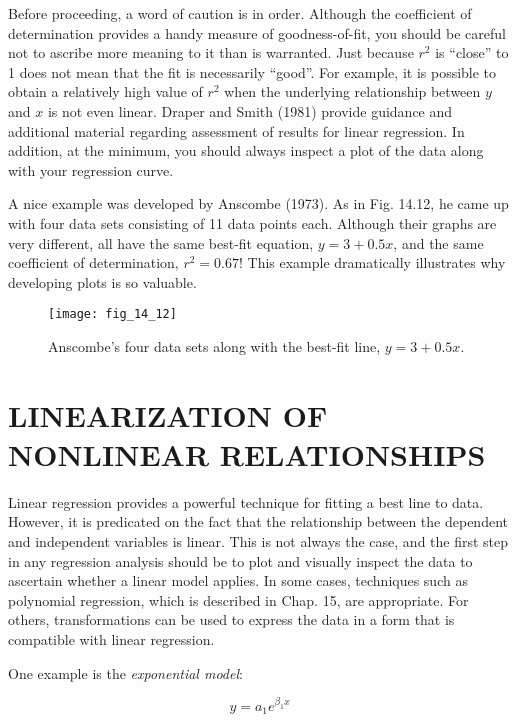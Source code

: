 \documentclass[../main.tex]{subfiles}
\begin{document}
Before proceeding, a word of caution is in order. Although the coefficient of determination provides a handy measure of goodness-of-fit, you should be careful not to ascribe more meaning to it than is warranted. Just because $r^2$ is ``close'' to 1 does not mean that the fit is necessarily ``good''. For example, it is possible to obtain a relatively high value of $r^2$ when the underlying relationship between $y$ and $x$ is not even linear. Draper and Smith (1981) provide guidance and additional material regarding assessment of results for linear regression. In addition, at the minimum, you should always inspect a plot of the data along with your regression curve.

A nice example was developed by Anscombe (1973). As in Fig. 14.12, he came up with four data sets consisting of 11 data points each. Although their graphs are very different, all have the same best-fit equation, $y = 3 + 0.5 x$, and the same coefficient of determination, $r^2 = 0.67$! This example dramatically illustrates why developing plots is so valuable.

\begin{figure}[H]
	\centering
	\texttt{[image: fig\_14\_12]}
	\caption{\textsf{Anscombe's four data sets along with the best-fit line, $y = 3 + 0.5x$.}}
	\label{fig:fig_14_12}
\end{figure}


\label{cha:cha_P_14_4}
\section{LINEARIZATION OF NONLINEAR RELATIONSHIPS}

Linear regression provides a powerful technique for fitting a best line to data. However, it is predicated on the fact that the relationship between the dependent and independent variables is linear. This is not always the case, and the first step in any regression analysis should be to plot and visually inspect the data to ascertain whether a linear model applies. In some cases, techniques such as polynomial regression, which is described in Chap. 15, are appropriate. For others, transformations can be used to express the data in a form that is compatible with linear regression.

One example is the \textit{exponential model}:

\begin{equation}
	\tag{14.22}
	y = a_1 e^{\beta_1 x}
\end{equation}
\end{document}

